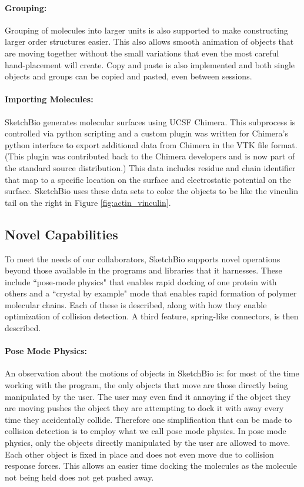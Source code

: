 \documentclass[twocolumn]{bmcart}%
\begin{document}
\paragraph*{Grouping:}
Grouping of molecules into larger units is also supported to make constructing larger order structures easier.  This also allows smooth animation of objects that are moving together without the small variations that even the most careful hand-placement will create.  Copy and paste is also implemented and both single objects and groups can be copied and pasted, even between sessions.

\paragraph*{Importing Molecules:}
SketchBio generates molecular surfaces using UCSF Chimera.  This subprocess is controlled via python scripting and a custom plugin was written for Chimera's python interface to export additional data from Chimera in the VTK file format.  (This plugin was contributed back to the Chimera developers and is now part of the standard source distribution.)  This data includes residue and chain identifier that map to a specific location on the surface and electrostatic potential on the surface.  SketchBio uses these data sets to color the objects to be like the vinculin tail on the right in Figure \ref{fig:actin_vinculin}.

\subsection*{Novel Capabilities}

To meet the needs of our collaborators, SketchBio supports novel operations beyond those available in the programs and libraries that it harnesses.  These include ``pose-mode physics" that enables rapid docking of one protein with others and a ``crystal by example" mode that enables rapid formation of polymer molecular chains.  Each of these is described, along with how they enable optimization of collision detection.  A third feature, spring-like connectors, is then described.

\paragraph*{Pose Mode Physics:}
An observation about the motions of objects in SketchBio is: for most of the time working with the program, the only objects that move are those directly being manipulated by the user.  The user may even find it annoying if the object they are moving pushes the object they are attempting to dock it with away every time they accidentally collide.  Therefore one simplification that can be made to collision detection is to employ what we call pose mode physics.  In pose mode physics, only the objects directly manipulated by the user are allowed to move.  Each other object is fixed in place and does not even move due to collision response forces.  This allows an easier time docking the molecules as the molecule not being held does not get pushed away.
\end{document}
